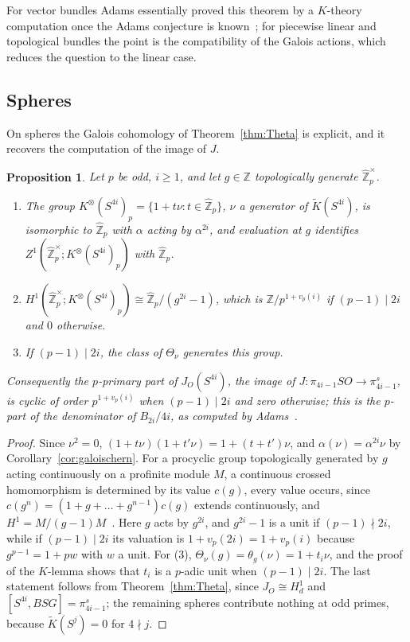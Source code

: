 \documentclass[11pt]{amsart}
\theoremstyle{plain}
\newtheorem{proposition}[theorem]{Proposition}
\theoremstyle{definition}
\numberwithin{equation}{section}
\newcommand{\Z}{\mathbb{Z}}
\newcommand{\Zhat}{\widehat{\mathbb{Z}}}
\newcommand{\units}{^{\times}}
\begin{document}
For vector bundles Adams essentially proved this theorem by a $K$-theory computation once the Adams conjecture is known~\cite{AdamsJ2}; for piecewise linear and topological bundles the point is the compatibility of the Galois actions, which reduces the question to the linear case.

\subsection{Spheres}
On spheres the Galois cohomology of Theorem~\ref{thm:Theta} is explicit, and it recovers the computation of the image of $J$.

\begin{proposition}\label{prop:spheres}
Let $p$ be odd, $i\ge1$, and let $g\in\Z$ topologically generate $\Zhat_p\units$.
\begin{enumerate}[label=\textup{(\arabic*)}]
\item The group $K^\otimes(S^{4i})_p=\{1+t\nu:t\in\Zhat_p\}$, $\nu$ a generator of $\widetilde K(S^{4i})$, is isomorphic to $\Zhat_p$ with $\alpha$ acting by $\alpha^{2i}$, and evaluation at $g$ identifies $Z^1(\Zhat_p\units;K^\otimes(S^{4i})_p)$ with $\Zhat_p$.
\item $H^1(\Zhat_p\units;K^\otimes(S^{4i})_p)\cong\Zhat_p/(g^{2i}-1)$, which is $\Z/p^{1+v_p(i)}$ if $(p-1)\mid2i$ and $0$ otherwise.
\item If $(p-1)\mid2i$, the class of $\Theta_\nu$ generates this group.
\end{enumerate}
Consequently the $p$-primary part of $J_O(S^{4i})$, the image of $J\colon\pi_{4i-1}SO\to\pi^s_{4i-1}$, is cyclic of order $p^{1+v_p(i)}$ when $(p-1)\mid2i$ and zero otherwise; this is the $p$-part of the denominator of $B_{2i}/4i$, as computed by Adams~\cite{AdamsJ2}.
\end{proposition}

\begin{proof}
Since $\nu^2=0$, $(1+t\nu)(1+t'\nu)=1+(t+t')\nu$, and $\alpha(\nu)=\alpha^{2i}\nu$ by Corollary~\ref{cor:galoischern}.
For a procyclic group topologically generated by $g$ acting continuously on a profinite module $M$, a continuous crossed homomorphism is determined by its value $c(g)$, every value occurs, since $c(g^n)=(1+g+\dots+g^{n-1})c(g)$ extends continuously, and $H^1=M/(g-1)M$~\cite{SerreGC}.
Here $g$ acts by $g^{2i}$, and $g^{2i}-1$ is a unit if $(p-1)\nmid2i$, while if $(p-1)\mid2i$ its valuation is $1+v_p(2i)=1+v_p(i)$ because $g^{p-1}=1+pw$ with $w$ a unit.
For (3), $\Theta_\nu(g)=\theta_g(\nu)=1+t_i\nu$, and the proof of the $K$-lemma shows that $t_i$ is a $p$-adic unit when $(p-1)\mid2i$.
The last statement follows from Theorem~\ref{thm:Theta}, since $J_O\cong H^1_d$ and $[S^{4i},BSG]=\pi^s_{4i-1}$; the remaining spheres contribute nothing at odd primes, because $\widetilde K(S^j)=0$ for $4\nmid j$.
\end{proof}
\end{document}
